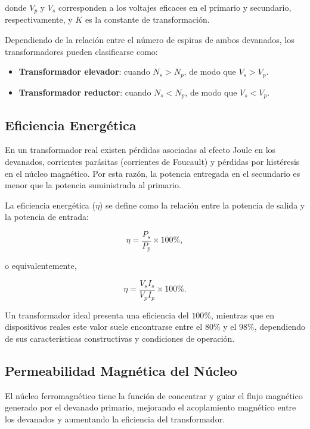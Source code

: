donde $V_p$ y $V_s$ corresponden a los voltajes eficaces en el primario y secundario, respectivamente, y $K$ es la constante de transformación.

Dependiendo de la relación entre el número de espiras de ambos devanados, los transformadores pueden clasificarse como:

\begin{itemize}
    \item \textbf{Transformador elevador}: cuando $N_s > N_p$, de modo que $V_s > V_p$.
    
    \item \textbf{Transformador reductor}: cuando $N_s < N_p$, de modo que $V_s < V_p$.
\end{itemize}

\subsection{Eficiencia Energética}

En un transformador real existen pérdidas asociadas al efecto Joule en los devanados, corrientes parásitas (corrientes de Foucault) y pérdidas por histéresis en el núcleo magnético. Por esta razón, la potencia entregada en el secundario es menor que la potencia suministrada al primario.

La eficiencia energética ($\eta$) se define como la relación entre la potencia de salida y la potencia de entrada:

\begin{equation}
\eta
=
\frac{P_s}{P_p}\times100\%,
\end{equation}

o equivalentemente,

\begin{equation}
\eta
=
\frac{V_s I_s}{V_p I_p}
\times100\%.
\end{equation}

Un transformador ideal presenta una eficiencia del $100\%$, mientras que en dispositivos reales este valor suele encontrarse entre el $80\%$ y el $98\%$, dependiendo de sus características constructivas y condiciones de operación.

\subsection{Permeabilidad Magnética del Núcleo}

El núcleo ferromagnético tiene la función de concentrar y guiar el flujo magnético generado por el devanado primario, mejorando el acoplamiento magnético entre los devanados y aumentando la eficiencia del transformador.

